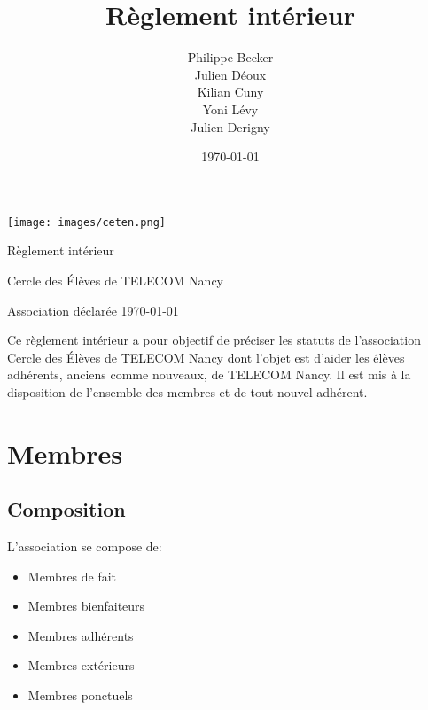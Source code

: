 \documentclass{article} %
\title{Règlement intérieur}
\author{Philippe Becker \\
	Julien Déoux \\
	Kilian Cuny \\
	Yoni Lévy \\
	Julien Derigny}
\date\today
\begin{document}

	
	\begin{titlepage}
		\begin{center}
			\texttt{[image: images/ceten.png]}\par
			\vspace{3cm}
			{\Huge\light{} Règlement intérieur}\par
			\vfill
			{\large Cercle des Élèves de TELECOM Nancy}\par
			{\large\light{} Association déclarée}
			\vfill
			{\light\today}\par
		\end{center}
	\end{titlepage}
	
	
	\tableofcontents

	
	\vfill
	\begin{center}
		{\light{} Ce règlement intérieur a pour objectif de préciser les statuts
		de l’association Cercle des Élèves de TELECOM Nancy dont l’objet est
		d’aider les élèves adhérents, anciens comme nouveaux, de TELECOM Nancy.
		Il est mis à la disposition de l’ensemble des membres et de tout nouvel
		adhérent.}
	\end{center}
	\vfill

	\clearpage



	\section{Membres}
\label{sec:membres}

		\subsection{Composition}
\label{sub:composition}

			L’association se compose de:
			\begin{itemize}
				\item Membres de fait
				\item Membres bienfaiteurs
				\item Membres adhérents
				\item Membres extérieurs
				\item Membres ponctuels
			\end{itemize}
\end{document}
